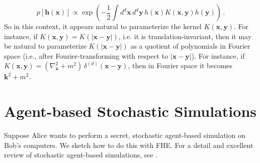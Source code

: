 \documentclass[12pt]{article}
\begin{document}
\begin{enumerate}
\begin{equation}
p[\textbf{h}(\textbf{x})] \propto \exp\left(- \frac{1}{2} \int d^d \textbf{x} \,d^d \textbf{y}\, h(\textbf{x}) K(\textbf{x},\textbf{y}) h(\textbf{y}) \right)\,.
\end{equation}
So in this context, it appears natural to parameterize the kernel $K(\textbf{x},\textbf{y})$.  For instance, if $K(\textbf{x},\textbf{y}) = K(|\textbf{x}-\textbf{y}|)$, i.e. it is translation-invariant, then it may be natural to parameterize $K(|\textbf{x}-\textbf{y}|)$ as a quotient of polynomials in Fourier space (i.e., after Fourier-transforming with respect to $|\textbf{x}-\textbf{y}|$).  For instance, if $K(\textbf{x},\textbf{y}) = (\nabla_\textbf{x}^2 + m^2) \,\delta^{(d)}(\textbf{x} - \textbf{y})$, then in Fourier space it becomes $\textbf{k}^2 + m^2$.
\end{enumerate}

\section{Agent-based Stochastic Simulations}

Suppose Alice wants to perform a secret, stochastic agent-based simulation on Bob's computers.  We sketch how to do this with FHE.  For a detail and excellent review of stochastic agent-based simulations, see \cite{agentbased1}.
\end{document}
